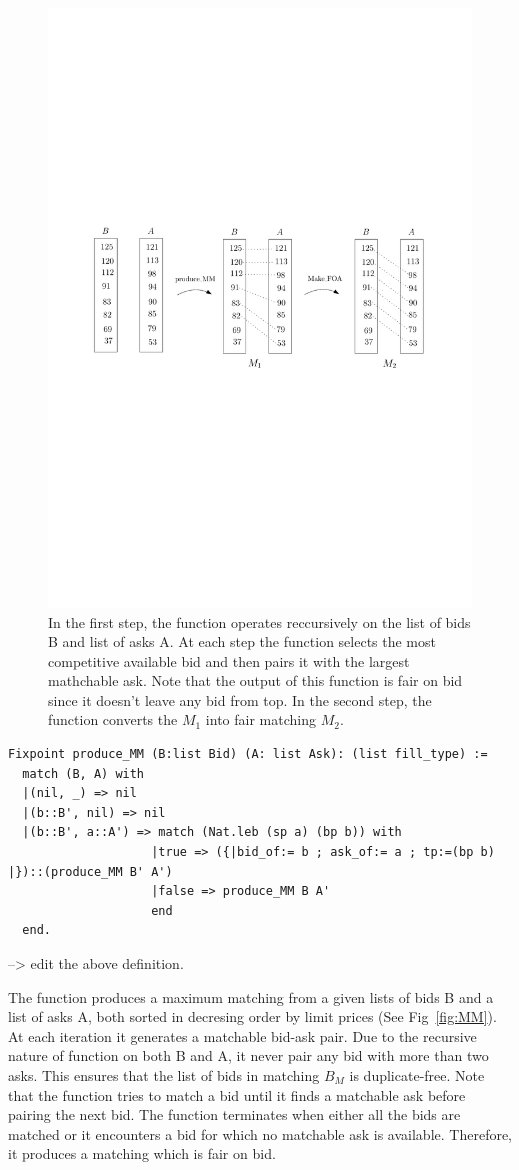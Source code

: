 \documentclass[a4paper,UKenglish,cleveref, autoref]{lipics-v2019}
\begin{document}
\begin{figure}[h!]
\centering
\includegraphics[width=.8\textwidth]{MM.pdf}
\caption{In the first step, the function  operates reccursively on the list of bids B and list of asks A. At each step the function  selects the most competitive available bid and then pairs it with the largest mathchable ask. Note that the output of this function is fair on bid since it doesn't leave any bid from top. In the second step, the function  converts the $M_1$ into fair matching $M_2$. }
\label{fig:mm}
\end{figure}

\begin{verbatim}
Fixpoint produce_MM (B:list Bid) (A: list Ask): (list fill_type) :=
  match (B, A) with
  |(nil, _) => nil
  |(b::B', nil) => nil              
  |(b::B', a::A') => match (Nat.leb (sp a) (bp b)) with
                    |true => ({|bid_of:= b ; ask_of:= a ; tp:=(bp b) |})::(produce_MM B' A')
                    |false => produce_MM B A'
                    end
  end. 
\end{verbatim}
--> edit the above definition.

The function  produces a maximum matching from a given lists of bids B and a list of asks A, both sorted in decresing order by limit prices (See Fig~\ref{fig:MM}). At each iteration it generates a matchable bid-ask pair. Due to the recursive nature of  function   on both B and A, it never pair any bid with more than two asks. This ensures that the list of bids in matching $B_M$ is duplicate-free. Note that the function  tries to match a bid until it finds a matchable ask before pairing the next bid. The function terminates when either all the bids are matched or it encounters a bid for which no matchable ask is available. Therefore, it produces a matching which is fair on bid.
\end{document}
